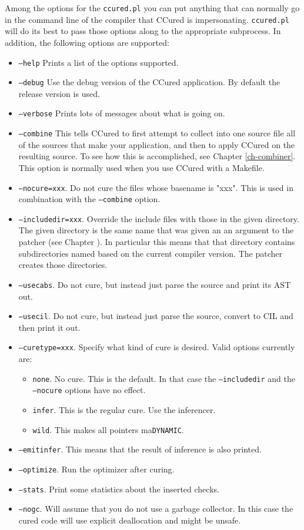 \documentclass{book}
\def\t#1{{\tt #1}}
\def\DYNAMIC{\t{DYNAMIC}}
\begin{document}
 Among the options for the \t{ccured.pl} you can put anything that can
normally go in the command line of the compiler that CCured is impersonating.
\t{ccured.pl} will do its best to pass those options along to the appropriate
subprocess. In addition, the following options are supported:

\begin{itemize}
\item \t{--help} Prints a list of the options supported.
\item \t{--debug} Use the debug version of the CCured application. By default
the release version is used.
\item \t{--verbose} Prints lots of messages about what is going on.
\item \t{--combine} This tells CCured to first attempt to collect into one
source file all of the sources that make your application, and then to apply
CCured on the resulting source. To see how this is accomplished, see Chapter
\ref{ch-combiner}. This option is normally used when you use CCured with a
Makefile. 
\item \t{--nocure=xxx}. Do not cure the files whose basename is "xxx". This is
used in combination with the \t{--combine} option.
\item \t{--includedir=xxx}. Override the include files with those in the given
directory. The given directory is the same name that was given an an argument
to the patcher (see Chapter \label{ch-patcher}). In particular this means that
that directory contains subdirectories named based on the current compiler
version. The patcher creates those directories. 
\item \t{--usecabs}. Do not cure, but instead just parse the source and print
its AST out. 
\item \t{--usecil}. Do not cure, but instead just parse the source, convert to
CIL and then print it out. 
\item \t{--curetype=xxx}. Specify what kind of cure is desired. Valid options
currently are:
   \begin{itemize}
    \item \t{none}. No cure. This is the default. In that case the
           \t{--includedir} and the \t{--nocure} options have no effect. 
    \item \t{infer}. This is the regular cure. Use the inferencer.
    \item \t{wild}. This makes all pointers ma\DYNAMIC{}.
   \end{itemize}
\item \t{--emitinfer}. This means that the result of inference is also
printed. 
\item \t{--optimize}. Run the optimizer after curing.
\item \t{--stats}. Print some statistics about the inserted checks.
\item \t{--nogc}. Will assume that you do not use a garbage collector. In this
case the cured code will use explicit deallocation and might be unsafe.
\end{itemize}
\end{document}
